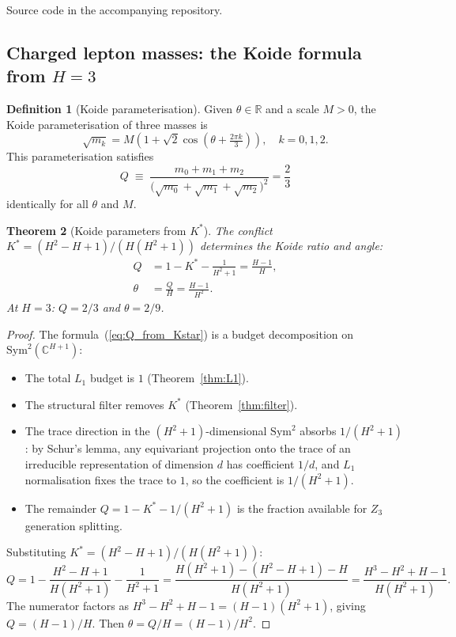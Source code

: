 \documentclass[11pt,a4paper]{article}
\newtheorem{theorem}{Theorem}[section]
\theoremstyle{definition}
\newtheorem{definition}[theorem]{Definition}
\theoremstyle{remark}
\newcommand{\C}{\mathbb{C}}
\newcommand{\R}{\mathbb{R}}
\newcommand{\Sym}{\mathrm{Sym}}
\begin{document}
Source code in the accompanying repository.

\subsection{Charged lepton masses: the Koide formula from $H=3$}\label{sec:koide_lepton}

\begin{definition}[Koide parameterisation]\label{def:koide}
Given $\theta\in\R$ and a scale $M>0$, the Koide parameterisation of three masses is
\begin{equation}\label{eq:koide_param}
\sqrt{m_k} = M\!\left(1+\sqrt{2}\cos\!\left(\theta+\tfrac{2\pi k}{3}\right)\right), \quad k=0,1,2.
\end{equation}
This parameterisation satisfies
\begin{equation}\label{eq:koide_Q}
Q \;\equiv\; \frac{m_0+m_1+m_2}{\bigl(\sqrt{m_0}+\sqrt{m_1}+\sqrt{m_2}\bigr)^2} = \frac{2}{3}
\end{equation}
identically for all $\theta$ and $M$.
\end{definition}

\begin{theorem}[Koide parameters from $K^*$]\label{thm:koide_angle}
The conflict $K^*=(H^2-H+1)/(H(H^2+1))$ determines the Koide ratio and angle:
\begin{align}
Q &= 1-K^*-\frac{1}{H^2+1} = \frac{H-1}{H}, \label{eq:Q_from_Kstar}\\[4pt]
\theta &= \frac{Q}{H} = \frac{H-1}{H^2}. \label{eq:theta_from_Q}
\end{align}
At $H=3$: $Q=2/3$ and $\theta=2/9$.
\end{theorem}

\begin{proof}
The formula~(\ref{eq:Q_from_Kstar}) is a budget decomposition on $\Sym^2(\C^{H+1})$:
\begin{itemize}[nosep]
\item The total $L_1$ budget is $1$ (Theorem~\ref{thm:L1}).
\item The structural filter removes $K^*$ (Theorem~\ref{thm:filter}).
\item The trace direction in the $(H^2\!+\!1)$-dimensional $\Sym^2$ absorbs $1/(H^2\!+\!1)$: by Schur's lemma, any equivariant projection onto the trace of an irreducible representation of dimension $d$ has coefficient $1/d$, and $L_1$ normalisation fixes the trace to $1$, so the coefficient is $1/(H^2+1)$.
\item The remainder $Q=1-K^*-1/(H^2+1)$ is the fraction available for $Z_3$ generation splitting.
\end{itemize}
Substituting $K^*=(H^2-H+1)/(H(H^2+1))$:
\[
Q = 1 - \frac{H^2-H+1}{H(H^2+1)} - \frac{1}{H^2+1}
= \frac{H(H^2+1)-(H^2-H+1)-H}{H(H^2+1)}
= \frac{H^3-H^2+H-1}{H(H^2+1)}.
\]
The numerator factors as $H^3-H^2+H-1=(H-1)(H^2+1)$, giving $Q=(H-1)/H$.
Then $\theta=Q/H=(H-1)/H^2$.
\end{proof}
\end{document}

